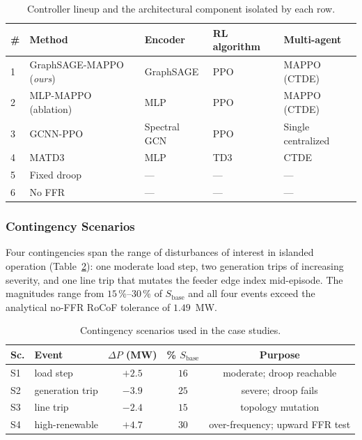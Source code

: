 \begin{table}[!t]
\caption{Controller lineup and the architectural component isolated
by each row.}
\label{tab:methods}
\centering
\footnotesize
\begin{tabular}{lllll}
\toprule
\# & Method & Encoder & RL algorithm & Multi-agent \\
\midrule
1 & GraphSAGE-MAPPO (\emph{ours}) & GraphSAGE   & PPO  & MAPPO (CTDE)         \\
2 & MLP-MAPPO (ablation)          & MLP         & PPO  & MAPPO (CTDE)         \\
3 & GCNN-PPO~\cite{guo2024gcnnppo}& Spectral GCN& PPO  & Single centralized   \\
4 & MATD3~\cite{li2025matd3}      & MLP         & TD3  & CTDE                 \\
5 & Fixed droop                   & ---         & ---  & ---                  \\
6 & No FFR                        & ---         & ---  & ---                  \\
\bottomrule
\end{tabular}
\end{table}

\subsubsection{Contingency Scenarios}
Four contingencies span the range of disturbances of interest in
islanded operation (Table~\ref{tab:scenarios}): one moderate load
step, two generation trips of increasing severity, and one line trip
that mutates the feeder edge index mid-episode. The magnitudes range
from $15$\,\%--$30$\,\% of $S_{\mathrm{base}}$ and all four events
exceed the analytical no-FFR RoCoF tolerance of $1.49$~MW.

\begin{table}[!t]
\caption{Contingency scenarios used in the case studies.}
\label{tab:scenarios}
\centering
\footnotesize
\begin{tabular}{llccc}
\toprule
Sc. & Event       & $\Delta P$ (MW) & \% $S_{\mathrm{base}}$ & Purpose \\
\midrule
S1  & load step       & $+2.5$ & $16$ & moderate; droop reachable        \\
S2  & generation trip & $-3.9$ & $25$ & severe; droop fails               \\
S3  & line trip       & $-2.4$ & $15$ & topology mutation                \\
S4  & high-renewable  & $+4.7$ & $30$ & over-frequency; upward FFR test  \\
\bottomrule
\end{tabular}
\end{table}

